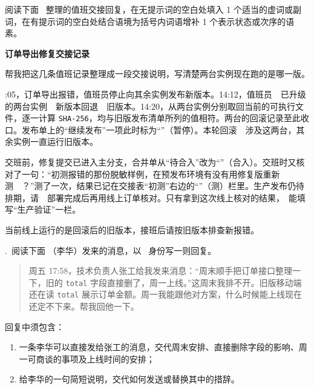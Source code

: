 \documentclass[UTF8, zihao=5, a4paper, fontset=fandol]{ctexart}
\begin{document}
\newpage
{}

阅读下面 \atag~整理的值班交接回复，在无提示词的空白处填入 1 个适当的虚词或副词，在有提示词的空白处结合语境为括号内词语增补 1 个表示状态或次序的语素。

\begin{center}
{\heiti\bfseries 订单导出修复交接记录}
\end{center}

\noindent\urole 帮我把这几条值班记录整理成一段交接说明，写清楚两台实例现在跑的是哪一版。

\smallskip
\noindent{}:05，订单导出报错，值班员停止向其余实例发布新版本。14:12，值班员~~已升级的两台实例~~新版本回退~~旧版本。14:20，从两台实例分别取回当前的可执行文件，逐一计算 \texttt{SHA-256}，均与旧版发布清单所列的值相符。两台的回滚记录至此收口。发布单上的“继续发布”一项此时标为\mbox{“”}（暂停）。本轮回滚~~涉及这两台，其余实例一直运行旧版本。

交班前，修复提交已进入主分支，合并单从“待合入”改为\mbox{“”}（合入）。交班时又核对了一句：“初测报错的那份脱敏样例，在预发布环境有没有用修复版重新测~~？”测了一次，结果已记在交接表“初测”右边的\mbox{“”}（测）栏里。生产发布仍待排期，请~~部署完成后再用线上订单核对。只有拿到这次线上核对的结果，~能填写“生产验证”一栏。

当前线上运行的是回滚后的旧版本，接班后请按旧版本排查新报错。

\vspace{2mm}


.~阅读下面 \utag（李华）发来的消息，以 \atag~身份写一则回复。

\begin{quote}
\kaishu\noindent\urole 周五 17:58，技术负责人张工给我发来消息：“周末顺手把订单接口整理一下，旧的 \texttt{total} 字段直接删了，周一上线。”这周末我排不开。旧版移动端还在读 \texttt{total} 展示订单金额。周一我能跟他对方案，什么时候能上线现在还定不下来。帮我回他一下。
\end{quote}

回复中须包含：

\begin{enumerate}[label=（\arabic*）, leftmargin=3em, labelsep=0pt, itemsep=1pt, topsep=2pt]
  \item 一条李华可以直接发给张工的消息，交代周末安排、直接删除字段的影响、周一可商谈的事项及上线时间的安排；
  \item 给李华的一句简短说明，交代如何发送或替换其中的措辞。
\end{enumerate}
\end{document}
